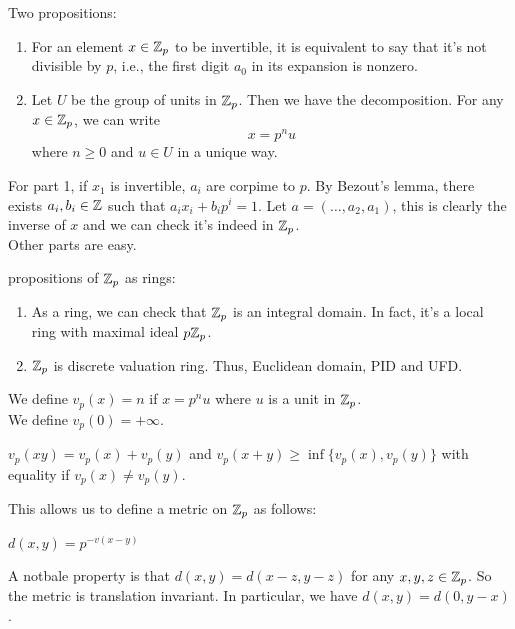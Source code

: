 \documentclass[15pt]{scrartcl}
\begin{document}
\begin{theorem}
    Two propositions:
    \begin{enumerate}
        \item For an element $x\in \mathbb Z_p$ to be invertible, it is equivalent to say that it's not divisible by $p$, i.e., the first digit $a_0$ in its expansion is nonzero.
        \item Let $U$ be the group of units in $\mathbb Z_p$. Then we have the decomposition. For any $x\in \mathbb Z_p$, we can write 
        \[x=p^nu\]
        where $n\geq 0$ and $u\in U$ in a unique way.
    \end{enumerate}
\end{theorem}
For part 1, if $x_1$ is invertible, $a_i$ are corpime to $p$. By Bezout's lemma, there exists $a_i,b_i\in \mathbb Z$ such that $a_i x_i + b_i p^i=1$. Let $a=(\ldots,a_2,a_1)$, this is clearly the inverse of $x$ and we can check it's indeed in $\mathbb Z_p$.
\\

Other parts are easy. 

\begin{proposition}
    propositions of $\mathbb Z_p$ as rings: 
    \begin{enumerate}
        \item As a ring, we can check that $\mathbb Z_p$ is an integral domain. In fact, it's a local ring with maximal ideal $p\mathbb Z_p$.
        \item $\mathbb Z_p$ is discrete valuation ring. Thus, Euclidean domain, PID and UFD.
    \end{enumerate}
\end{proposition} 
\begin{definition}
    We define $v_p(x)=n$ if $x=p^n u$ where $u$ is a unit in $\mathbb Z_p$.
    \\
    We define $v_p(0)=+\infty$.
\end{definition}
\begin{proposition}
    $v_p(xy)=v_p(x)+v_p(y)$ and $v_p(x+y)\geq \inf\{v_p(x),v_p(y)\}$ with equality if $v_p(x)\neq v_p(y)$.
\end{proposition}
This allows us to define a metric on $\mathbb Z_p$ as follows:
\begin{definition}
    $d(x,y)=p^{-v(x-y)}$
\end{definition}
A notbale property is that $d(x,y)=d(x-z,y-z)$ for any $x,y,z\in \mathbb Z_p$. So the metric is translation invariant. In particular, we have $d(x,y)=d(0,y-x)$.
\\
\end{document}
